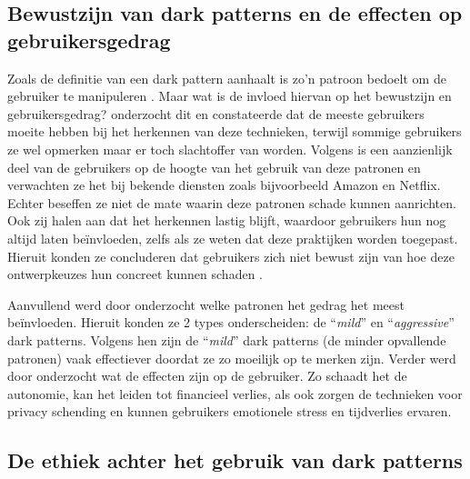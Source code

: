\vspace{1em}

\subsection{Bewustzijn van dark patterns en de effecten op gebruikersgedrag}
\label{subsec:effecten}

\vspace{1em}

Zoals de definitie van een dark pattern aanhaalt is zo’n patroon bedoelt om de gebruiker te manipuleren \autocite{Kollmer2022}. Maar wat is de invloed hiervan op het bewustzijn en gebruikersgedrag? \textcite{OECD2022} onderzocht dit en constateerde dat de meeste gebruikers moeite hebben bij het herkennen van deze technieken, terwijl sommige gebruikers ze wel opmerken maar er toch slachtoffer van worden. Volgens \textcite{BongardBlanchy2021} is een aanzienlijk deel van de gebruikers op de hoogte van het gebruik van deze patronen en verwachten ze het bij bekende diensten zoals bijvoorbeeld Amazon en Netflix. Echter beseffen ze niet de mate waarin deze patronen schade kunnen aanrichten. Ook zij halen aan dat het herkennen lastig blijft, waardoor gebruikers hun nog altijd laten beïnvloeden, zelfs als ze weten dat deze praktijken worden toegepast. Hieruit konden ze concluderen dat gebruikers zich niet bewust zijn van hoe deze ontwerpkeuzes hun concreet kunnen schaden \autocite{BongardBlanchy2021}. 

\vspace{1em}

Aanvullend werd door \textcite{OECD2022} onderzocht welke patronen het gedrag het meest beïnvloeden. Hieruit konden ze 2 types onderscheiden: de “\emph{mild}” en “\emph{aggressive}” dark patterns. Volgens hen zijn de “\emph{mild}” dark patterns (de minder opvallende patronen) vaak effectiever doordat ze zo moeilijk op te merken zijn. Verder werd door \textcite{OECD2022} onderzocht wat de effecten zijn op de gebruiker. Zo schaadt het de autonomie, kan het leiden tot financieel verlies, als ook zorgen de technieken voor privacy schending en kunnen gebruikers emotionele stress en tijdverlies ervaren. 


\vspace{1em}

\subsection{De ethiek achter het gebruik van dark patterns}
\label{subsec:ethisch-ontwerp}

